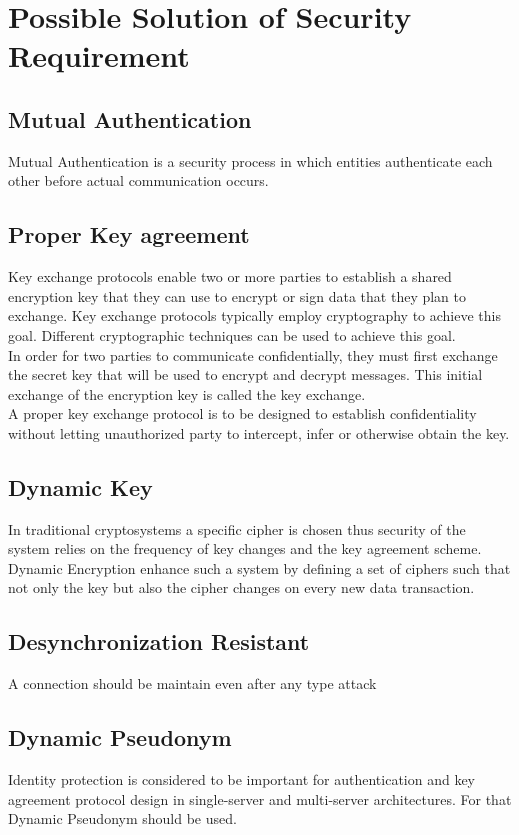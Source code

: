 \section{Possible Solution of Security Requirement}{
    \subsection{Mutual Authentication}{
        Mutual Authentication is a security process in which entities authenticate each other before actual communication occurs.
    }
    \subsection{Proper Key agreement}{
        Key exchange protocols enable two or more parties to establish a shared encryption key that they can use to encrypt or sign data that they plan to exchange. Key exchange protocols typically employ cryptography to achieve this goal. Different cryptographic techniques can be used to achieve this goal.\\

        In order for two parties to communicate confidentially, they must first exchange the secret key that will be used to encrypt and decrypt messages. This initial exchange of the encryption key is called the key exchange.\\

        A proper key exchange protocol is to be designed to establish confidentiality 
        without letting unauthorized party to intercept, infer or otherwise obtain the key. 

    }
    \subsection{Dynamic Key}{
        In traditional cryptosystems a specific cipher is chosen thus security of the system relies on the frequency of key changes and the key agreement scheme. Dynamic Encryption enhance such a system by defining a set of ciphers such that not only the key but also the cipher changes on every new data transaction.
    }
    \subsection{Desynchronization Resistant}{
        A connection should be maintain even after any type attack 
    }
    \subsection{Dynamic Pseudonym}{
        Identity protection is considered to be important for authentication and key agreement protocol design in single-server and multi-server architectures.
        For that Dynamic Pseudonym should be used.
    }
}
